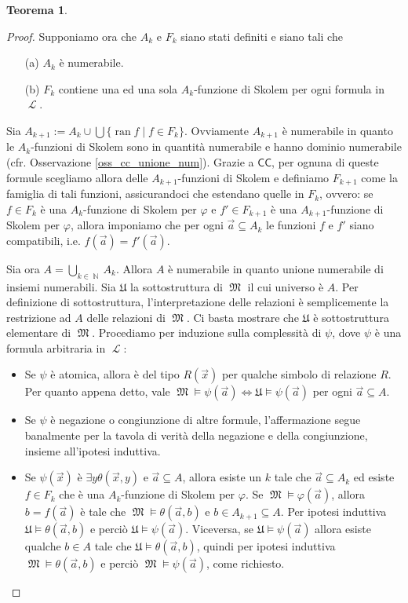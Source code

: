\documentclass[12pt,a4paper]{report}
\theoremstyle{definition}
\newtheorem{teo}{Teorema}[section]  %
\theoremstyle{num.custom-title}
\DeclareMathOperator{\ran}{ran}
\DeclareMathOperator{\U}{\mathcal{U}}
\DeclareMathOperator{\LL}{\mathcal{L}}
\DeclareMathOperator{\N}{\mathbb{N}}
\DeclareMathOperator{\M}{\mathfrak{M}}
\DeclareMathOperator{\sse}{\subseteq}
\newcommand{\CC}{\ensuremath{\mathsf{CC}}\xspace}
\renewcommand{\phi}{\varphi}
\renewcommand{\U}{\mathfrak{U}}
\begin{document}
\begin{teo}
\begin{proof}
Supponiamo ora che $A_k$ e $F_k$ siano stati definiti e siano tali che
\begin{itemize}
\item[(a)] $A_k$ è numerabile.
\item[(b)] $F_k$ contiene una ed una sola $A_k$-funzione di Skolem per ogni formula in $\LL$.
\end{itemize}
Sia $A_{k+1} := A_k \cup \bigcup \{\ran f \mid f \in F_k\}$. Ovviamente $A_{k+1}$ è numerabile in quanto le $A_k$-funzioni di Skolem sono in quantità numerabile e hanno dominio numerabile (cfr. Osservazione \ref{oss_cc_unione_num}). Grazie a \CC, per ognuna di queste formule scegliamo allora delle $A_{k+1}$-funzioni di Skolem e definiamo $F_{k+1}$ come la famiglia di tali funzioni, assicurandoci che estendano quelle in $F_k$, ovvero: se $f \in F_k$ è una $A_k$-funzione di Skolem per $\phi$ e $f' \in F_{k+1}$ è una $A_{k+1}$-funzione di Skolem per $\phi$, allora imponiamo che per ogni $\vec a \sse A_k$ le funzioni $f$ e $f'$ siano compatibili, i.e. $f(\vec a)=f'(\vec a)$.

Sia ora $A = \bigcup_{k \in \N} A_k$. Allora $A$ è numerabile in quanto unione numerabile di insiemi numerabili. Sia $\U$ la sottostruttura di $\M$ il cui universo è $A$. Per definizione di sottostruttura, l'interpretazione delle relazioni è semplicemente la restrizione ad $A$ delle relazioni di $\M$. Ci basta mostrare che $\U$ è sottostruttura elementare di $\M$. Procediamo per induzione sulla complessità di $\psi$, dove $\psi$ è una formula arbitraria in $\LL$:
\begin{itemize}
\item Se $\psi$ è atomica, allora è del tipo $R(\vec x)$ per qualche simbolo di relazione $R$. Per quanto appena detto, vale $\M \models \psi(\vec a) \iff \U \models \psi(\vec a)$ per ogni $\vec a \sse A$.
\item Se $\psi$ è negazione o congiunzione di altre formule, l'affermazione segue banalmente per la tavola di verità della negazione e della congiunzione, insieme all'ipotesi induttiva.
\item Se $\psi(\vec x)$ è $\exists y \theta(\vec x, y)$ e $\vec a \sse A$, allora esiste un $k$ tale che $\vec a \sse A_k$ ed esiste $f \in F_k$ che è una $A_k$-funzione di Skolem per $\phi$. Se $\M \models \phi(\vec a)$, allora $b=f(\vec a)$ è tale che $\M \models \theta(\vec a, b)$ e $b \in A_{k+1} \sse A$. Per ipotesi induttiva $\U \models \theta(\vec a, b)$ e perciò $\U \models \psi(\vec a)$. Viceversa, se $\U \models \psi(\vec a)$ allora esiste qualche $b \in A$ tale che $\U \models \theta(\vec a, b)$, quindi per ipotesi induttiva $\M \models \theta(\vec a, b)$ e perciò $\M \models \psi(\vec a)$, come richiesto.
\end{itemize}
\end{proof}
\end{teo}
\end{document}
